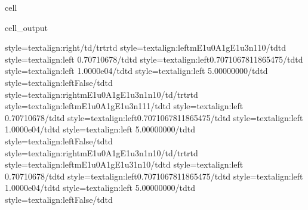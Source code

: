 \documentclass[letterpaper,table,10pt,english]{jupyterBook}
\begin{document}
\begin{sphinxuseclass}{cell}
\begin{sphinxVerbatimOutput}
\begin{sphinxuseclass}{cell_output}
\begin{sphinxVerbatim}[commandchars=\\\{\}]
style=\PYGZbs{}\PYGZsq{}text\PYGZhy{}align:right\PYGZbs{}\PYGZsq{}\PYGZgt{}\PYGZlt{}/td\PYGZgt{}\PYGZlt{}/tr\PYGZgt{}\PYGZlt{}tr\PYGZgt{}\PYGZlt{}td style=\PYGZbs{}\PYGZsq{}text\PYGZhy{}align:left\PYGZbs{}\PYGZsq{}\PYGZgt{}m\PYGZus{}E1u\PYGZus{}0\PYGZus{}A1g\PYGZus{}E1u\PYGZus{}3\PYGZus{}n1\PYGZus{}1\PYGZus{}0\PYGZlt{}/td\PYGZgt{}\PYGZlt{}td style=\PYGZbs{}\PYGZsq{}text\PYGZhy{}align:left\PYGZbs{}\PYGZsq{}\PYGZgt{} 0.70710678\PYGZlt{}/td\PYGZgt{}\PYGZlt{}td style=\PYGZbs{}\PYGZsq{}text\PYGZhy{}align:left\PYGZbs{}\PYGZsq{}\PYGZgt{}0.7071067811865475\PYGZlt{}/td\PYGZgt{}\PYGZlt{}td style=\PYGZbs{}\PYGZsq{}text\PYGZhy{}align:left\PYGZbs{}\PYGZsq{}\PYGZgt{} 1.0000e\PYGZhy{}04\PYGZlt{}/td\PYGZgt{}\PYGZlt{}td style=\PYGZbs{}\PYGZsq{}text\PYGZhy{}align:left\PYGZbs{}\PYGZsq{}\PYGZgt{} 5.00000000\PYGZlt{}/td\PYGZgt{}\PYGZlt{}td style=\PYGZbs{}\PYGZsq{}text\PYGZhy{}align:left\PYGZbs{}\PYGZsq{}\PYGZgt{}False\PYGZlt{}/td\PYGZgt{}\PYGZlt{}td style=\PYGZbs{}\PYGZsq{}text\PYGZhy{}align:right\PYGZbs{}\PYGZsq{}\PYGZgt{}m\PYGZus{}E1u\PYGZus{}0\PYGZus{}A1g\PYGZus{}E1u\PYGZus{}3\PYGZus{}n1\PYGZus{}n1\PYGZus{}0\PYGZlt{}/td\PYGZgt{}\PYGZlt{}/tr\PYGZgt{}\PYGZlt{}tr\PYGZgt{}\PYGZlt{}td style=\PYGZbs{}\PYGZsq{}text\PYGZhy{}align:left\PYGZbs{}\PYGZsq{}\PYGZgt{}m\PYGZus{}E1u\PYGZus{}0\PYGZus{}A1g\PYGZus{}E1u\PYGZus{}3\PYGZus{}n1\PYGZus{}1\PYGZus{}1\PYGZlt{}/td\PYGZgt{}\PYGZlt{}td style=\PYGZbs{}\PYGZsq{}text\PYGZhy{}align:left\PYGZbs{}\PYGZsq{}\PYGZgt{} 0.70710678\PYGZlt{}/td\PYGZgt{}\PYGZlt{}td style=\PYGZbs{}\PYGZsq{}text\PYGZhy{}align:left\PYGZbs{}\PYGZsq{}\PYGZgt{}0.7071067811865475\PYGZlt{}/td\PYGZgt{}\PYGZlt{}td style=\PYGZbs{}\PYGZsq{}text\PYGZhy{}align:left\PYGZbs{}\PYGZsq{}\PYGZgt{} 1.0000e\PYGZhy{}04\PYGZlt{}/td\PYGZgt{}\PYGZlt{}td style=\PYGZbs{}\PYGZsq{}text\PYGZhy{}align:left\PYGZbs{}\PYGZsq{}\PYGZgt{} 5.00000000\PYGZlt{}/td\PYGZgt{}\PYGZlt{}td style=\PYGZbs{}\PYGZsq{}text\PYGZhy{}align:left\PYGZbs{}\PYGZsq{}\PYGZgt{}False\PYGZlt{}/td\PYGZgt{}\PYGZlt{}td style=\PYGZbs{}\PYGZsq{}text\PYGZhy{}align:right\PYGZbs{}\PYGZsq{}\PYGZgt{}m\PYGZus{}E1u\PYGZus{}0\PYGZus{}A1g\PYGZus{}E1u\PYGZus{}3\PYGZus{}n1\PYGZus{}n1\PYGZus{}0\PYGZlt{}/td\PYGZgt{}\PYGZlt{}/tr\PYGZgt{}\PYGZlt{}tr\PYGZgt{}\PYGZlt{}td style=\PYGZbs{}\PYGZsq{}text\PYGZhy{}align:left\PYGZbs{}\PYGZsq{}\PYGZgt{}m\PYGZus{}E1u\PYGZus{}0\PYGZus{}A1g\PYGZus{}E1u\PYGZus{}3\PYGZus{}1\PYGZus{}n1\PYGZus{}0\PYGZlt{}/td\PYGZgt{}\PYGZlt{}td style=\PYGZbs{}\PYGZsq{}text\PYGZhy{}align:left\PYGZbs{}\PYGZsq{}\PYGZgt{} 0.70710678\PYGZlt{}/td\PYGZgt{}\PYGZlt{}td style=\PYGZbs{}\PYGZsq{}text\PYGZhy{}align:left\PYGZbs{}\PYGZsq{}\PYGZgt{}0.7071067811865475\PYGZlt{}/td\PYGZgt{}\PYGZlt{}td style=\PYGZbs{}\PYGZsq{}text\PYGZhy{}align:left\PYGZbs{}\PYGZsq{}\PYGZgt{} 1.0000e\PYGZhy{}04\PYGZlt{}/td\PYGZgt{}\PYGZlt{}td style=\PYGZbs{}\PYGZsq{}text\PYGZhy{}align:left\PYGZbs{}\PYGZsq{}\PYGZgt{} 5.00000000\PYGZlt{}/td\PYGZgt{}\PYGZlt{}td style=\PYGZbs{}\PYGZsq{}text\PYGZhy{}align:left\PYGZbs{}\PYGZsq{}\PYGZgt{}False\PYGZlt{}/td\PYGZgt{}\PYGZlt{}td 
\end{sphinxVerbatim}
\end{sphinxuseclass}
\end{sphinxVerbatimOutput}
\end{sphinxuseclass}
\end{document}
